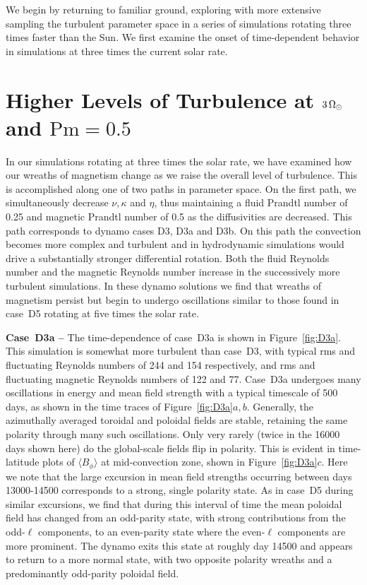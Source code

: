 We begin by returning to familiar ground, exploring
with more extensive sampling the turbulent parameter space in a
series of simulations rotating three times faster than the Sun.
We first examine the onset of time-dependent behavior in simulations
at three times the current solar rate.


\section{Higher Levels of Turbulence at  $3\thinspace\Omega_\odot$ and $\mathrm{Pm}=0.5$}
In our simulations rotating at three times the solar rate, we have
examined how our wreaths of magnetism change as we raise the overall
level of turbulence.  This is accomplished along one of two paths in
parameter space.  On the first
path, we simultaneously decrease $\nu, \kappa$ and $\eta$, thus maintaining
a fluid Prandtl number of 0.25 and magnetic Prandtl number of 0.5 as
the diffusivities are decreased.  This path corresponds to dynamo
cases D3, D3a and D3b.  On this path the convection becomes more
complex and turbulent and in hydrodynamic simulations would drive a
substantially stronger differential rotation.  Both the fluid Reynolds
number and the magnetic Reynolds number increase in the successively
more turbulent simulations. 
In these dynamo solutions we find that wreaths of magnetism persist but begin
to undergo oscillations similar to those found in case~D5 rotating at
five times the solar rate.   

\textbf{Case~D3a --} The time-dependence of case~D3a is shown in Figure~\ref{fig:D3a}.
This simulation is somewhat more turbulent than case~D3, with typical
rms and fluctuating Reynolds numbers of 244 and 154 respectively, and
rms and fluctuating magnetic Reynolds numbers of 122 and 77.
Case~D3a undergoes many oscillations in energy and mean field strength
with a typical timescale of 500 days, as shown in the time traces of
Figure~\ref{fig:D3a}$a,b$.  Generally, the azimuthally averaged
toroidal and poloidal fields are stable, retaining the same polarity
through many such oscillations.  Only very rarely 
(twice in the 16000 days shown here) do the global-scale fields flip
in polarity.  This is evident in time-latitude plots of
$\langle B_\phi \rangle$ at mid-convection zone, shown in
Figure~\ref{fig:D3a}$c$.  Here we note that the large excursion in
mean field strengths occurring between days 13000-14500 corresponds to
a strong, single polarity state.  As in case~D5 during similar
excursions, we find that during this interval of time the mean poloidal
field has changed from an odd-parity state, with strong contributions
from the odd-$\ell$ components, to an even-parity state where the
even-$\ell$ components are more prominent.  The dynamo exits this
state at roughly day 14500 and appears to return to a more normal
state, with two opposite polarity wreaths and a predominantly
odd-parity poloidal field.  

